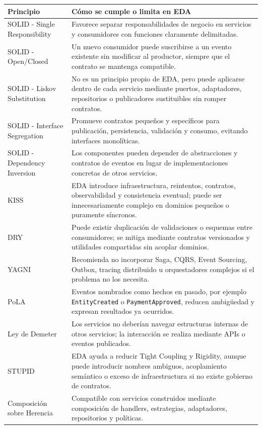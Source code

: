 \documentclass[12pt,a4paper]{article}
\begin{document}
\begin{longtable}{P{0.32\textwidth} P{0.60\textwidth}}
\toprule
\textbf{Principio} & \textbf{Cómo se cumple o limita en EDA} \\
\midrule
SOLID - Single Responsibility & Favorece separar responsabilidades de negocio en servicios y consumidores con funciones claramente delimitadas. \\
SOLID - Open/Closed & Un nuevo consumidor puede suscribirse a un evento existente sin modificar al productor, siempre que el contrato se mantenga compatible. \\
SOLID - Liskov Substitution & No es un principio propio de EDA, pero puede aplicarse dentro de cada servicio mediante puertos, adaptadores, repositorios o publicadores sustituibles sin romper contratos. \\
SOLID - Interface Segregation & Promueve contratos pequeños y específicos para publicación, persistencia, validación y consumo, evitando interfaces monolíticas. \\
SOLID - Dependency Inversion & Los componentes pueden depender de abstracciones y contratos de eventos en lugar de implementaciones concretas de otros servicios. \\
KISS & EDA introduce infraestructura, reintentos, contratos, observabilidad y consistencia eventual; puede ser innecesariamente complejo en dominios pequeños o puramente síncronos. \\
DRY & Puede existir duplicación de validaciones o esquemas entre consumidores; se mitiga mediante contratos versionados y utilidades compartidas sin acoplar dominios. \\
YAGNI & Recomienda no incorporar Saga, CQRS, Event Sourcing, Outbox, tracing distribuido u orquestadores complejos si el problema no los necesita. \\
PoLA & Eventos nombrados como hechos en pasado, por ejemplo \texttt{EntityCreated} o \texttt{PaymentApproved}, reducen ambigüedad y expresan resultados ya ocurridos. \\
Ley de Demeter & Los servicios no deberían navegar estructuras internas de otros servicios; la interacción se realiza mediante APIs o eventos publicados. \\
STUPID & EDA ayuda a reducir Tight Coupling y Rigidity, aunque puede introducir nombres ambiguos, acoplamiento semántico o exceso de infraestructura si no existe gobierno de contratos. \\
Composición sobre Herencia & Compatible con servicios construidos mediante composición de handlers, estrategias, adaptadores, repositorios y políticas. \\
\bottomrule
\end{longtable}
\end{document}
